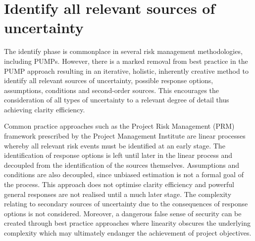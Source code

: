 
\section{Identify all relevant sources of uncertainty} \label{s:Identify}





The identify phase is commonplace in several risk management methodologies, including PUMPs. 
However, there is a marked removal from best practice in the PUMP approach resulting in an iterative, holistic, inherently creative method to identify all relevant sources of uncertainty, possible response options, assumptions, conditions and second-order sources.
This encourages the consideration of all types of uncertainty to a relevant degree of detail thus achieving clarity efficiency.

Common practice approaches such as the Project Risk Management (PRM) framework prescribed by the Project Management Institute \citep{pmi2013} are linear processes whereby all relevant risk events must be identified at an early stage. 
The identification of response options is left until later in the linear process and decoupled from the identification of the sources themselves.
Assumptions and conditions are also decoupled, since unbiased estimation is not a formal goal of the process. 
This approach does not optimise clarity efficiency and powerful general responses are not realised until a much later stage.
The complexity relating to secondary sources of uncertainty due to the consequences of response options is not considered.
Moreover, a dangerous false sense of security can be created through best practice approaches where linearity obscures the underlying complexity which may ultimately endanger the achievement of project objectives.
                         

